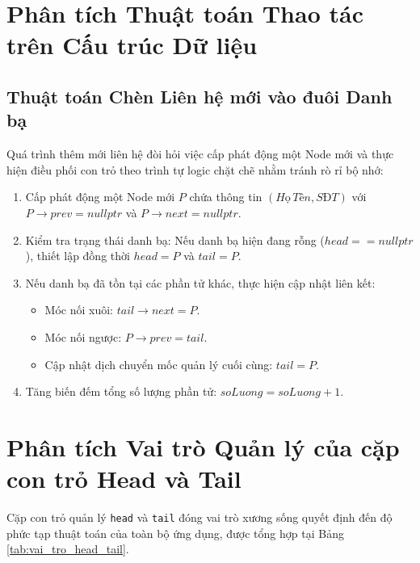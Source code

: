 \section{Phân tích Thuật toán Thao tác trên Cấu trúc Dữ liệu}

\subsection{Thuật toán Chèn Liên hệ mới vào đuôi Danh bạ}
Quá trình thêm mới liên hệ đòi hỏi việc cấp phát động một Node mới và thực hiện điều phối con trỏ theo trình tự logic chặt chẽ nhằm tránh rò rỉ bộ nhớ:
\begin{enumerate}
    \item Cấp phát động một Node mới $P$ chứa thông tin $(Họ\,Tên, SĐT)$ với $P \rightarrow prev = nullptr$ và $P \rightarrow next = nullptr$.
    \item Kiểm tra trạng thái danh bạ: Nếu danh bạ hiện đang rỗng ($head == nullptr$), thiết lập đồng thời $head = P$ và $tail = P$.
    \item Nếu danh bạ đã tồn tại các phần tử khác, thực hiện cập nhật liên kết: 
    \begin{itemize}
        \item Móc nối xuôi: $tail \rightarrow next = P$.
        \item Móc nối ngược: $P \rightarrow prev = tail$.
        \item Cập nhật dịch chuyển mốc quản lý cuối cùng: $tail = P$.
    \end{itemize}
    \item Tăng biến đếm tổng số lượng phần tử: $soLuong = soLuong + 1$.
\end{enumerate}

\section{Phân tích Vai trò Quản lý của cặp con trỏ Head và Tail}

Cặp con trỏ quản lý \texttt{head} và \texttt{tail} đóng vai trò xương sống quyết định đến độ phức tạp thuật toán của toàn bộ ứng dụng, được tổng hợp tại Bảng \ref{tab:vai_tro_head_tail}.

